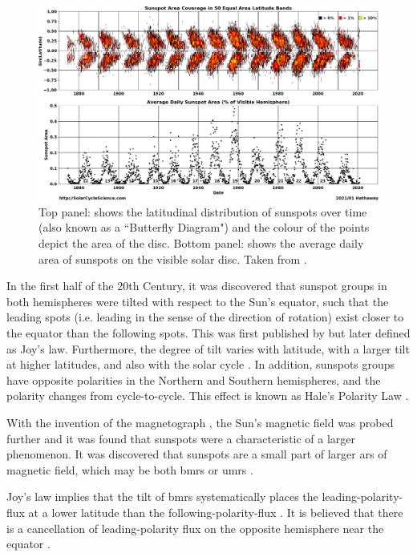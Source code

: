 \begin{figure}[ht!]
	\centering
	\includegraphics[width=\columnwidth]{ButterflyDiagram.png}
	\caption{Top panel: shows the latitudinal distribution of sunspots over time (also known as a ``Butterfly Diagram") and the colour of the points depict the area of the disc. Bottom panel: shows the average daily area of sunspots on the visible solar disc. Taken from \citet{hathaway_solar_2017}.}
	\label{fig:butterfly}
\end{figure}

In the first half of the 20th Century, it was discovered that sunspot groups in both hemispheres were tilted with respect to the Sun's equator, such that the leading spots (i.e. leading in the sense of the direction of rotation) exist closer to the equator than the following spots. This was first published by \citet{hale_magnetic_1919} but later defined as Joy's law. Furthermore, the degree of tilt varies with latitude, with a larger tilt at higher latitudes, and also with the solar cycle \citep{hathaway_solar_2015}. In addition, sunspots groups have opposite polarities in the Northern and Southern hemispheres, and the polarity changes from cycle-to-cycle. This effect is known as Hale's Polarity Law \citep{hale_law_1925}.

With the invention of the magnetograph \citep{babcock_solar_1953}, the Sun's magnetic field was probed further and it was found that sunspots were a characteristic of a larger phenomenon. It was discovered that sunspots are a small part of larger \glspl{ar} of magnetic field, which may be both \glspl{bmr} or \glspl{umr} \citep{babcock_suns_1955}.

Joy's law implies that the tilt of \glspl{bmr} systematically places the leading-polarity-flux at a lower latitude than the following-polarity-flux \citep{hathaway_solar_2015}. It is believed that there is a cancellation of leading-polarity flux on the opposite hemisphere near the equator \citep{dasi-espuig_sunspot_2010}. %


